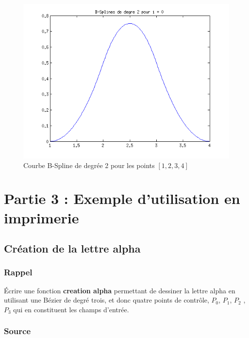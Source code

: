 \documentclass[a4paper,10pt]{report}
\begin{document}
\begin{figure}[h]
	\begin{center}
		\includegraphics[scale=0.6]{bik3}
		\caption{Courbe B-Spline de degrée 2 pour les points $[1, 2, 3, 4]$}
	\end{center}
\end{figure}

\chapter*{Partie 3 : Exemple d’utilisation en imprimerie}

\section*{Création de la lettre alpha}

\subsection*{Rappel}

Écrire une fonction \textbf{creation alpha} permettant de dessiner la lettre alpha en utilisant une Bézier de degré trois, et donc quatre points de contrôle, $P_0$, $P_1$, $P_2$ , $P_3$ qui en constituent les champs d’entrée.

\subsection*{Source}
\end{document}
